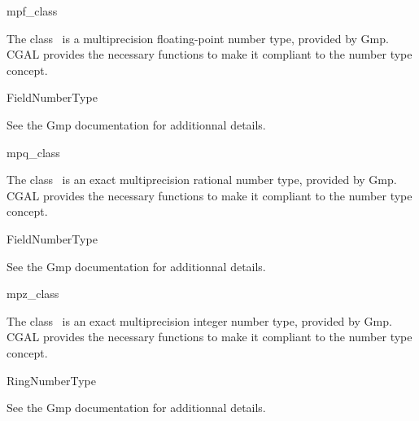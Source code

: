 \ccDefGlobalScope{}

\begin{ccRefClass}{mpf_class}

\ccDefinition

The class \ccRefName\ is a multiprecision floating-point number type,
provided by {\sc Gmp}.
CGAL provides the necessary functions to make it compliant to the number type
concept.


\ccIsModel
FieldNumberType

See the {\sc Gmp} documentation for additionnal details.

\end{ccRefClass}

\begin{ccRefClass}{mpq_class}

\ccDefinition

The class \ccRefName\ is an exact multiprecision rational number type,
provided by {\sc Gmp}.
CGAL provides the necessary functions to make it compliant to the number type
concept.


\ccIsModel
FieldNumberType

See the {\sc Gmp} documentation for additionnal details.

\end{ccRefClass}

\begin{ccRefClass}{mpz_class}

\ccDefinition

The class \ccRefName\ is an exact multiprecision integer number type,
provided by {\sc Gmp}.
CGAL provides the necessary functions to make it compliant to the number type
concept.


\ccIsModel
RingNumberType

See the {\sc Gmp} documentation for additionnal details.

\end{ccRefClass}
